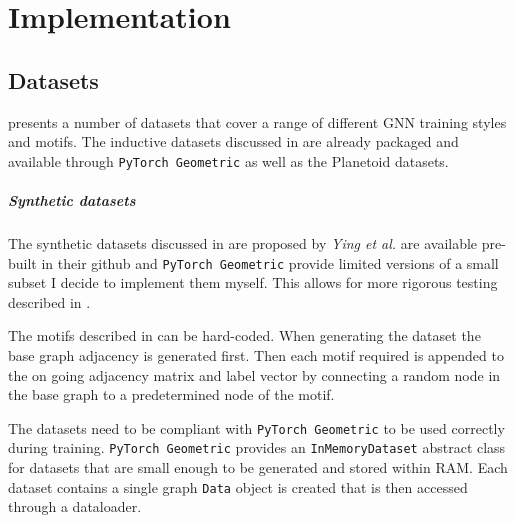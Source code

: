 \chapter{Implementation}

\section{Datasets}
\label{sec:datasets-imp}
 presents a number of datasets that cover a range of different GNN training styles and motifs.
The inductive datasets discussed in  are already packaged and available through \texttt{PyTorch Geometric}\cite{Fey/Lenssen/2019} as well as the Planetoid\cite{planetoid}\cite{citation} datasets.

\paragraph{Synthetic datasets}
The synthetic datasets discussed in  are proposed by \textit{Ying et al.}\cite{ying2019gnnexplainer} are available pre-built in their github and \texttt{PyTorch Geometric} provide limited versions of a small subset I decide to implement them myself.
This allows for more rigorous testing 
described in .

The motifs described in  can be hard-coded.
When generating the dataset the base graph adjacency is generated first. 
Then each motif required is 
appended to the on going adjacency matrix and label vector by connecting
a random node in the base graph to a predetermined node of the motif.

The datasets need to be compliant with \texttt{PyTorch Geometric} to be used correctly during training.
\texttt{PyTorch Geometric} provides an \texttt{InMemoryDataset} abstract class for datasets that are small enough to be generated and stored within RAM.
Each dataset contains a single graph \texttt{Data} object is created that is then accessed through a dataloader.

